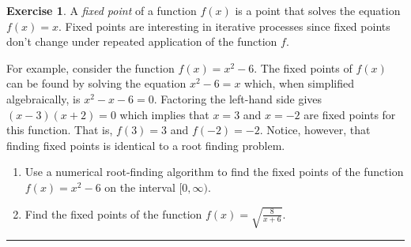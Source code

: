 \documentclass[
]{book}
\theoremstyle{definition}
\theoremstyle{definition}
\theoremstyle{definition}
\newtheorem{exercise}{Exercise}[chapter]
\theoremstyle{remark}
\begin{document}
\begin{exercise}
\protect\hypertarget{exr:unnamed-chunk-130}{}{\label{exr:unnamed-chunk-130} }A \emph{fixed point} of a function \(f(x)\) is a point that solves the equation
\(f(x) =  x\). Fixed points are interesting in iterative processes since fixed
points don't change under repeated application of the function \(f\).

For example, consider the function \(f(x) = x^2 - 6\). The fixed points of
\(f(x)\) can be found by solving the equation \(x^2 - 6 = x\) which, when
simplified algebraically, is \(x^2 - x -  6 = 0\). Factoring the left-hand side gives \((x-3)(x+2)=0\) which
implies that \(x=3\) and \(x=-2\) are fixed points for this function. That
is, \(f(3) = 3\) and \(f(-2) = -2\). Notice, however, that finding fixed
points is identical to a root finding problem.

\begin{enumerate}
\def\labelenumi{\alph{enumi}.}
\item
  Use a numerical root-finding algorithm to find the fixed points of
  the function \(f(x) = x^2 - 6\) on the interval \([0,\infty)\).
\item
  Find the fixed points of the function \(f(x) =  \sqrt{\frac{8}{x+6}}\).
\end{enumerate}
\end{exercise}

\begin{center}\rule{0.5\linewidth}{0.5pt}\end{center}
\end{document}
